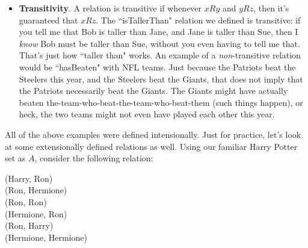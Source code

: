 \begin{itemize}
Shockingly, it's actually possible for a relation to be \textit{both}
symmetric \textit{and} antisymmetric! (but not asymmetric.) For instance,
the empty relation (with no ordered pairs) is both symmetric and
antisymmetric. It's symmetric because for every ordered pair $(x,y)$ in it
(of which there are zero), there's also the corresponding
$(y,x)$.\footnote{Wait --- how can I say that?  How can there be "the
corresponding" ordered pair in a relation that has \textit{no} ordered
pairs?! The answer has to do with the first clause: \textit{for every
ordered pair $(x,y)$ in it.} There are none of these, therefore, no
$(y,x)$'s are required. The condition is trivially satisfied. This is
common in mathematics: we say that A requires B, but this means that if A
is \textit{not} true, then B is not forced.} And similarly, for every
ordered pair $(x,y)$, the corresponding $(y,x)$ is \textit{not} present.
Another example is a relation with only ``doubles" in it --- say, \{~(3,3),
(7,7), (Fred, Fred)~\}. This, too, is both symmetric and antisymmetric
(work it out!)

\item \textbf{Transitivity}. A relation is transitive if whenever $x R y$
and $y R z$, then it's guaranteed that $x R z$. The ``isTallerThan"
relation we defined is transitive: if you tell me that Bob is taller than
Jane, and Jane is taller than Sue, then I \textit{know} Bob must be taller
than Sue, without you even having to tell me that. That's just how ``taller
than" works. An example of a \textit{non}-transitive relation would be
``hasBeaten" with NFL teams. Just because the Patriots beat the Steelers
this year, and the Steelers beat the Giants, that does not imply that the
Patriots necessarily beat the Giants. The Giants might have actually beaten
the-team-who-beat-the-team-who-beat-them (such things happen), or heck,
the two teams might not even have played each other this year.

\end{itemize}

All of the above examples were defined intensionally. Just for practice,
let's look at some extensionally defined relations as well. Using our
familiar Harry Potter set as $A$, consider the following relation:

\begin{center}
(Harry, Ron) \\
(Ron, Hermione) \\
(Ron, Ron) \\
(Hermione, Ron) \\
(Ron, Harry) \\
(Hermione, Hermione)
\end{center}

